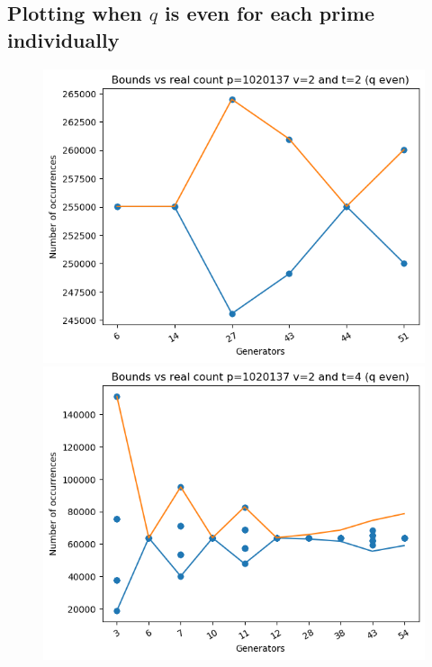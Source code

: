 \documentclass{article}
\begin{document}
\subsection{Plotting when $q$ is even for each prime individually}
\begin{figure}[H]
    \begin{minipage}{.49\textwidth}
            \centering
            \includegraphics[width=\textwidth]{../plots/tuples_figures/1020137v2qeven/test_p1020137_v2_t2_q_even.png}
            \includegraphics[width=\textwidth]{../plots/tuples_figures/1020137v2qeven/test_p1020137_v2_t4_q_even.png}

\end{minipage}
\end{figure}
\end{document}
